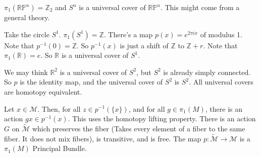             $\pi_{1}(\mathbb{RP}^{n})=\mathbb{Z}_{2}$ and $S^{n}$ is a universal
            cover of $\mathbb{RP}^{n}$. This might come from a general theory.
            \begin{example}
                Take the circle $S^{1}$.
                $\pi_{1}(S^{1})=\mathbb{Z}$.
                There's a map $p(x)=e^{2\pi{ix}}$ of modulus 1.
                Note that $p^{-1}(0) = \mathbb{Z}$.
                So $p^{-1}(x)$ is just a shift of
                $\mathbb{Z}$ to $\mathbb{Z}+r$.
                Note that $\pi_{1}(\mathbb{R})=e$.
                So $\mathbb{R}$ is a universal cover of $S^{1}$.
            \end{example}
            \begin{example}
                We may think $\mathbb{R}^2$ is a universal
                cover of $S^{2}$, but $S^{2}$ is already
                simply connected. So $p$ is the
                identity map, and the universal cover of $S^{2}$
                is $S^{2}$. All universal covers are
                homotopy equivalent.
            \end{example}
            Let $x\in\mathcal{M}$. Then, for all $z\in p^{-1}(\{x\})$, and for
            all $g\in \pi_{1}(M)$, there is an action $gx\in p^{-1}(x)$. This
            uses the homotopy lifting property. There is an action $G$ on
            $\tilde{\mathcal{M}}$ which preserves the fiber (Takes every element
            of a fiber to the same fiber. It does not mix fibers), is
            transitive, and is free. The map
            $p:\tilde{\mathcal{M}}\rightarrow\mathcal{M}$ is a $\pi_{1}(M)$
            Principal Bundle.
